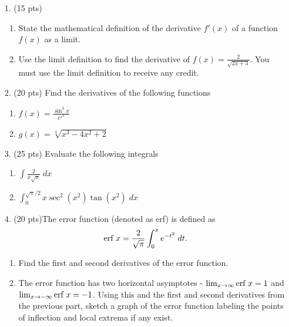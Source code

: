 \documentclass[11pt,reqno]{article}
\theoremstyle{definition}
\begin{document}
	\begin{enumerate}
		\item[1.]  (15 pts) 
		\begin{enumerate}
			
			\item State the mathematical definition of the derivative $f'(x)$ of a function $f(x)$ as a limit.
			
			\vspace{1.5in}
			
			\item Use the limit definition to find the derivative of $f(x)=\frac{2}{\sqrt{2x+3}}$. You must use the limit definition to receive any credit.
			
		\end{enumerate}
		\newpage
		\item[2.](20 pts) Find the derivatives of the following functions
		\begin{enumerate}
			\item $f(x) = \frac{\sin^3 x}{e^{x^2}}$ 
			\vspace{10cm}
			\item $g(x) = \sqrt[4]{x^3 - 4x^2 + 2}$
		\end{enumerate}
		\newpage
		\item[3.](25 pts) Evaluate the following integrals
			\begin{enumerate}
				\item $\int \frac{2}{x\sqrt{x}} \; dx$ 
				\vspace{6cm}
				\item $\int_{0}^{\sqrt{\pi}/2} x \sec^2 (x^2) \tan(x^2) \;dx$
			\end{enumerate}
		\newpage
		\item[4.] (20 pts)The error function (denoted as erf) is defined as $$\textnormal{erf }x = \frac{2}{\sqrt{\pi}} \int_{0}^{x} e^{-t^2} \; dt.$$ 
		\begin{enumerate}
			\item Find the first and second derivatives of the error function.
			\vspace{5cm}
			\item The error function has two horizontal asymptotes - $\lim_{x \to \infty} \textnormal{erf } x = 1$ and $\lim_{x \to -\infty} \textnormal{erf } x = -1$. Using this and the first and second derivatives from the previous part, sketch a graph of the error function labeling the points of inflection and local extrema if any exist.

\end{enumerate}
\end{enumerate}
\end{document}
